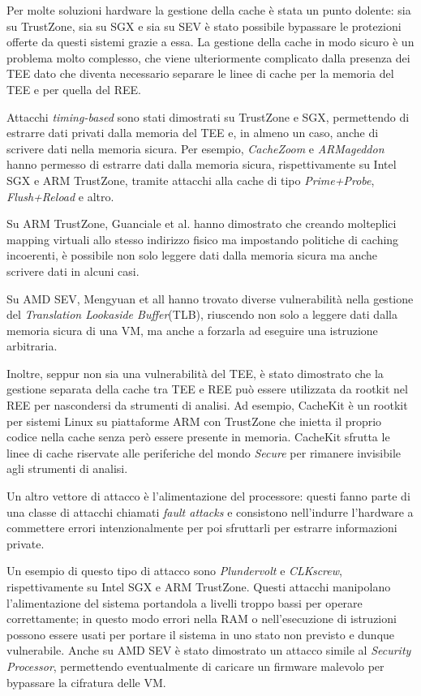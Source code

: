 \documentclass[12pt,italian]{report}
\begin{document}
\bigbreak \noindent
Per molte soluzioni hardware la gestione della cache è stata
un punto dolente: sia su TrustZone, sia su SGX e sia su SEV
è stato possibile bypassare le protezioni offerte da questi sistemi
grazie a essa.
La gestione della cache in modo sicuro è un problema molto complesso,
che viene ulteriormente complicato dalla presenza dei TEE dato che
diventa necessario separare le linee di cache per la memoria del TEE
e per quella del REE.

Attacchi \textit{timing-based} sono stati dimostrati su TrustZone e SGX,
permettendo di estrarre dati privati dalla memoria del TEE e, in almeno
un caso, anche di scrivere dati nella memoria sicura.
Per esempio, \textit{CacheZoom}\cite{cachezoom} e
\textit{ARMageddon}\cite{armageddon} hanno permesso di estrarre dati
dalla memoria sicura, rispettivamente su Intel SGX e ARM TrustZone,
tramite attacchi alla cache di tipo \textit{Prime+Probe},
\textit{Flush+Reload} e altro.

Su ARM TrustZone, Guanciale et al.\cite{aliasdriven} hanno dimostrato
che creando molteplici mapping virtuali allo stesso indirizzo fisico
ma impostando politiche di caching incoerenti, è possibile non solo
leggere dati dalla memoria sicura ma anche scrivere dati in alcuni casi.

Su AMD SEV, Mengyuan et all\cite{sev_tlb_poisoning} hanno trovato diverse
vulnerabilità nella gestione del \textit{Translation Lookaside Buffer}(TLB),
riuscendo non solo a leggere dati dalla memoria sicura di una VM, ma anche
a forzarla ad eseguire una istruzione arbitraria.

Inoltre, seppur non sia una vulnerabilità del TEE, è stato
dimostrato che la gestione separata della cache tra TEE e REE
può essere utilizzata da rootkit nel REE per nascondersi da strumenti
di analisi.
Ad esempio, CacheKit\cite{cachekit} è un rootkit per sistemi Linux
su piattaforme ARM con TrustZone che inietta il proprio codice nella
cache senza però essere presente in memoria.
CacheKit sfrutta le linee di cache riservate alle periferiche
del mondo \textit{Secure} per rimanere invisibile agli strumenti
di analisi. 

\bigbreak
Un altro vettore di attacco è l'alimentazione del processore: questi
fanno parte di una classe di attacchi chiamati \textit{fault attacks}
e consistono nell'indurre l'hardware a commettere errori intenzionalmente
per poi sfruttarli per estrarre informazioni private.

Un esempio di questo tipo di attacco sono
\textit{Plundervolt}\cite{plundervolt} e
\textit{CLKscrew}\cite{clkscrew},
rispettivamente su Intel SGX e ARM TrustZone.
Questi attacchi manipolano l'alimentazione del sistema portandola a livelli
troppo bassi per operare correttamente; in questo modo errori nella RAM
o nell'esecuzione di istruzioni possono essere usati per portare il sistema
in uno stato non previsto e dunque vulnerabile.
Anche su AMD SEV è stato dimostrato un attacco simile\cite{sev_power_attack}
al \textit{Security Processor}, permettendo eventualmente di caricare un
firmware malevolo per bypassare la cifratura delle VM.
\end{document}
